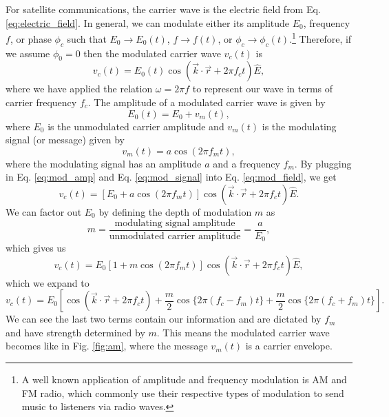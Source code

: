 \documentclass[10pt]{article}
\begin{document}
For satellite communications, the carrier wave is the electric field from Eq. \ref{eq:electric_field}. In general, we can modulate either its amplitude $E_0$, frequency $f$, or phase $\phi_c$ such that $E_0\rightarrow E_0(t)$, $f\rightarrow f(t)$, or $\phi_c\rightarrow \phi_c(t)$.\footnote{A well known application of amplitude and frequency modulation is AM and FM radio, which commonly use their respective types of modulation to send music to listeners via radio waves.} Therefore, if we assume $\phi_0 = 0$ then the modulated carrier wave $v_c(t)$ is
\begin{equation}
v_c(t) = E_0(t) \cos (\vec{k}\cdot \vec{r} + 2\pi f_c t) \hat{E},
    \label{eq:mod_field}
\end{equation}
where we have applied the relation $\omega = 2\pi f$ to represent our wave in terms of carrier frequency $f_c$.  The amplitude of a modulated carrier wave is given by
\begin{equation}
E_0(t) = E_0 + v_m(t),
    \label{eq:mod_amp}
\end{equation}
where $E_0$ is the unmodulated carrier amplitude and $v_m(t)$ is the modulating signal (or message) given by
\begin{equation}
v_m(t) = a\cos(2\pi f_m t),
    \label{eq:mod_signal}
\end{equation}
where the modulating signal has an amplitude $a$ and a frequency $f_m$. By plugging in Eq. \ref{eq:mod_amp} and Eq. \ref{eq:mod_signal} into Eq. \ref{eq:mod_field}, we get
\begin{equation}
v_c(t) = [E_0 + a\cos(2\pi f_m t)] \cos (\vec{k}\cdot \vec{r} + 2\pi f_c t) \hat{E}.
    \label{eq:mod_carrier1}
\end{equation}
We can factor out $E_0$ by defining the depth of modulation $m$ as
\begin{equation}
m = \frac{\text{modulating signal amplitude}}{\text{unmodulated carrier amplitude}} = \frac{a}{E_0},
    \label{eq:m}
\end{equation}
which gives us
\begin{equation}
v_c(t) = E_0[1 + m\cos(2\pi f_m t)] \cos (\vec{k}\cdot \vec{r} + 2\pi f_c t) \hat{E},
    \label{eq:mod_carrier2}
\end{equation}
which we expand to
\begin{equation}
v_c(t) = E_0[\cos(\vec{k}\cdot \vec{r} + 2\pi f_c t)+\frac{m}{2}\cos\{2\pi (f_c-f_m) t\}+\frac{m}{2}\cos\{2\pi (f_c+f_m) t\}].
    \label{eq:mod_carrier3}
\end{equation}
We can see the last two terms contain our information and are dictated by $f_m$ and have strength determined by $m$. This means the modulated carrier wave becomes like in Fig. \ref{fig:am}, where the message $v_m(t)$ is a carrier envelope. 
\end{document}
